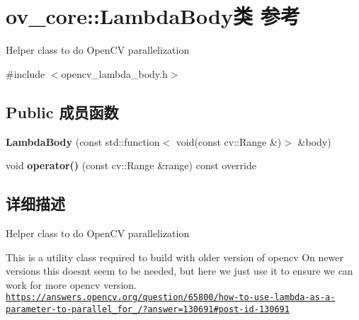 \hypertarget{classov__core_1_1LambdaBody}{}\section{ov\+\_\+core\+:\+:Lambda\+Body类 参考}
\label{classov__core_1_1LambdaBody}


Helper class to do Open\+CV parallelization  




{\ttfamily \#include $<$opencv\+\_\+lambda\+\_\+body.\+h$>$}

\subsection*{Public 成员函数}
\begin{DoxyCompactItemize}
\item 
\mbox{\label{classov__core_1_1LambdaBody_a57cc3809565739625b969ac7c8512679}} 
{\bfseries Lambda\+Body} (const std\+::function$<$ void(const cv\+::\+Range \&)$>$ \&body)
\item 
\mbox{\label{classov__core_1_1LambdaBody_a1c5e4804e776da07eddfab15fdfbe325}} 
void {\bfseries operator()} (const cv\+::\+Range \&range) const override
\end{DoxyCompactItemize}


\subsection{详细描述}
Helper class to do Open\+CV parallelization 

This is a utility class required to build with older version of opencv On newer versions this doesn\textquotesingle{}t seem to be needed, but here we just use it to ensure we can work for more opencv version. \href{https://answers.opencv.org/question/65800/how-to-use-lambda-as-a-parameter-to-parallel_for_/?answer=130691#post-id-130691}{\tt https\+://answers.\+opencv.\+org/question/65800/how-\/to-\/use-\/lambda-\/as-\/a-\/parameter-\/to-\/parallel\+\_\+for\+\_\+/?answer=130691\#post-\/id-\/130691} 